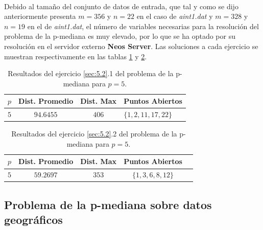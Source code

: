 \documentclass[spanish]{article}
\begin{document}
			\paragraph{}
			Debido al tamaño del conjunto de datos de entrada, que tal y como se dijo anteriormente presenta $m = 356$ y $n = 22$ en el caso de \emph{aint1.dat} y $m = 328 $ y $n = 19$ en el de \emph{aint1.dat}, el número de variables necesarias para la resolución del problema de la p-mediana es muy elevado, por lo que se ha optado por su resolución en el servidor externo \textbf{Neos Server}\cite{tool:neos-server}. Las soluciones a cada ejercicio se muestran respectivamente en las tablas \ref{table:sol-5.2.1} y \ref{table:sol-5.2.2}.


			\begin{table}[h]
				\begin{center}
					\begin{tabular}{|c || c || c || l | }
						\hline
						$p$ 	& Dist. Promedio	&	Dist. Max & Puntos Abiertos	 \\ \hline \hline
						$5$		& $94.6455$				&	$406$					& $\{1,2,11,17,22\}$ \\
						\hline
					\end{tabular}
				\end{center}
				\caption{Resultados del ejercicio \ref{sec:5.2}.1 del problema de la p-mediana para $p=5$.}
				\label{table:sol-5.2.1}
			\end{table}

			\begin{table}[h]
				\begin{center}
					\begin{tabular}{|c || c || c || c || l | }
						\hline
						$p$ 	& Dist. Promedio	&	Dist. Max & Puntos Abiertos	 \\ \hline \hline
						$5$		& $59.2697$				&	$353$					& $\{1,3,6,8,12\}$ \\
						\hline
					\end{tabular}
				\end{center}
				\caption{Resultados del ejercicio \ref{sec:5.2}.2 del problema de la p-mediana para $p=5$.}
				\label{table:sol-5.2.2}
			\end{table}


		\subsection{Problema de la p-mediana sobre datos geográficos}
		\label{sec:5.3}
\end{document}

